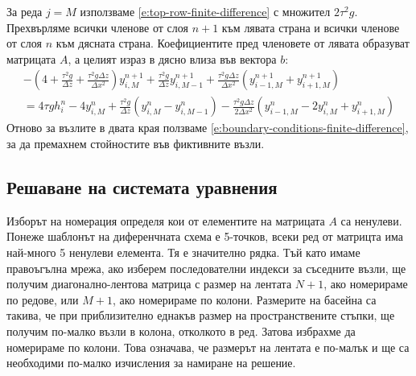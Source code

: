 \documentclass[12pt]{article}
\numberwithin{equation}{section}
\begin{document}
За реда $j=M$ използваме \autoref{e:top-row-finite-difference} с множител $2 \tau^2 g$. Прехвърляме всички членове от слоя $n+1$ към лявата страна и всички членове от слоя $n$ към дясната страна. Коефициентите пред членовете от лявата образуват матрицата $A$, а целият израз в дясно влиза във вектора $b$:
\begin{equation}
    \label{e:top-row-finite-difference-normalized}
    \begin{split}
        -\left( 4 + \frac{\tau^2 g}{\Delta z} + \frac{\tau^2 g \Delta z}{\Delta x^2} \right) y^{n+1}_{i,M}
        + \frac{\tau^2 g}{\Delta z} y^{n+1}_{i,M-1}
        + \frac{\tau^2 g \Delta z}{\Delta x^2} (y^{n+1}_{i-1,M} + y^{n+1}_{i+1,M}) \\
        = 4\tau g h^n_i
        - 4 y^n_{i,M}
        + \frac{\tau^2 g}{\Delta z} (y^n_{i,M} - y^n_{i,M-1})
        - \frac{\tau^2 g \Delta z}{2 \Delta x^2} (y^n_{i-1,M} - 2y^n_{i,M} + y^n_{i+1,M})
    \end{split}
\end{equation}
Отново за възлите в двата края ползваме \autoref{e:boundary-conditions-finite-difference}, за да премахнем стойностите във фиктивните възли.

\subsection{Решаване на системата уравнения}
Изборът на номерация определя кои от елементите на матрицата $A$ са ненулеви. Понеже шаблонът на диференчната схема е 5-точков, всеки ред от матрицта има най-много 5 ненулеви елемента. Тя е значително рядка. Тъй като имаме правоъгълна мрежа, ако изберем последователни индекси за съседните възли, ще получим диагонално-лентова матрица с размер на лентата $N+1$, ако номерираме по редове, или $M+1$, ако номерираме по колони. Размерите на басейна са такива, че при приблизително еднакъв размер на пространствените стъпки, ще получим по-малко възли в колона, отколкото в ред. Затова избрахме да номерираме по колони. Това означава, че размерът на лентата е по-малък и ще са необходими по-малко изчисления за намиране на решение.
\end{document}
